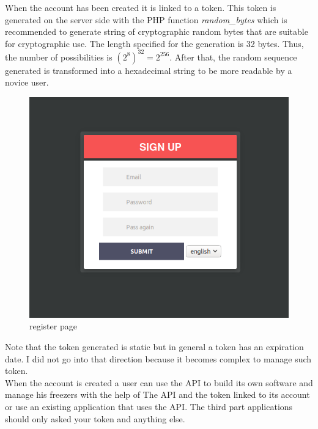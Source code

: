 When the account has been created it is linked to a token. This token is generated on the server side with the PHP function \textit{random\_bytes} which is recommended to generate string of cryptographic random bytes that are suitable for cryptographic use. The length  specified for the generation is 32 bytes. Thus, the number of possibilities is $(2^8)^{32} = 2^{256}$. After that, the random sequence generated is transformed into a hexadecimal string to be more readable by a novice user.\\
\begin{figure}[H]
\centering
\includegraphics[scale=0.3]{./images/register.png}
\caption{register page}
\label{fig:register}
\end{figure}

Note that the token generated is static but in general a token has an expiration date. I did not go into that direction because it becomes complex to manage such token. \\

When the account is created a user can use the API to build its own software and manage his freezers with the help of The API and the token linked to its account or use an existing application that uses the API. The third part applications should only asked your token and anything else.\\

